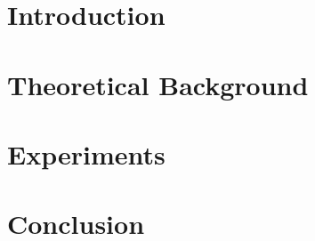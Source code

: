 
\addtolength{\evensidemargin}{-12mm}

\part[Introduction]{Introduction}
\label{part:introduction}




\part[Theoretical Background]{Theoretical Background}
\label{part:theoretical_background}




\part[Experiments]{Experiments}
\label{part:experiments}



\part[Conclusion]{Conclusion}
\label{part:conclusion}

